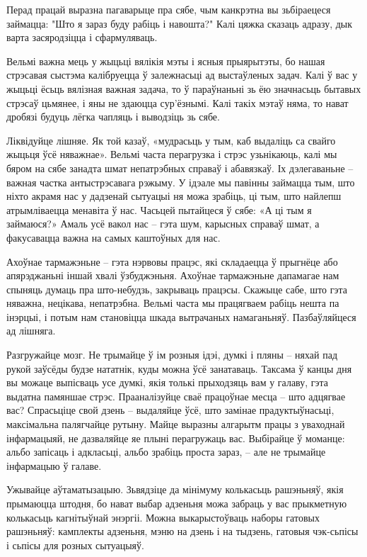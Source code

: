 Перад працай выразна пагаварыце пра сябе, чым канкрэтна вы зьбіраецеся займацца: "Што я зараз буду рабіць і навошта?" Калі цяжка сказаць адразу, дык варта засяродзіцца і сфармуляваць.

Вельмі важна мець у жыцьці вялікія мэты і ясныя прыярытэты, бо нашая стрэсавая сыстэма калібруецца ў залежнасьці ад выстаўленых задач. Калі ў вас у жыцьці ёсьць вялізная важная задача, то ў параўнаньні зь ёю значнасьць бытавых стрэсаў цьмянее, і яны не здаюцца сур'ёзнымі. Калі такіх мэтаў няма, то нават дробязі будуць лёгка чапляць і выводзіць зь сябе.

Ліквідуйце лішняе. Як той казаў, «мудрасьць у тым, каб выдаліць са свайго жыцьця ўсё няважнае». Вельмі часта перагрузка і стрэс узьнікаюць, калі мы бяром на сябе занадта шмат непатрэбных справаў і абавязкаў. Іх дэлегаваньне – важная частка антыстрэсавага рэжыму. У ідэале мы павінны займацца тым, што ніхто акрамя нас у дадзенай сытуацыі ня можа зрабіць, ці тым, што найлепш атрымліваецца менавіта ў нас. Часьцей пытайцеся ў сябе: «А ці тым я займаюся?» Амаль усё вакол нас – гэта шум, карысных справаў шмат, а факусавацца важна на самых каштоўных для нас.

Ахоўнае тармажэньне – гэта нэрвовы працэс, які складаецца ў прыгнёце або апярэджаньні іншай хвалі ўзбуджэньня. Ахоўнае тармажэньне дапамагае нам спыняць думаць пра што-небудзь, закрываць працэсы. Скажыце сабе, што гэта няважна, нецікава, непатрэбна. Вельмі часта мы працягваем рабіць нешта па інэрцыі, і потым нам становіцца шкада вытрачаных намаганьняў. Пазбаўляйцеся ад лішняга.

Разгружайце мозг. Не трымайце ў ім розныя ідэі, думкі і пляны – няхай пад рукой заўсёды будзе нататнік, куды можна ўсё занатаваць. Таксама ў канцы дня вы можаце выпісваць усе думкі, якія толькі прыходзяць вам у галаву, гэта выдатна памяншае стрэс. Прааналізуйце сваё працоўнае месца – што адцягвае вас? Спрасьціце свой дзень – выдаляйце ўсё, што замінае прадуктыўнасьці, максімальна палягчайце рутыну. Майце выразны алгарытм працы з уваходнай інфармацыяй, не дазваляйце яе плыні перагружаць вас. Выбірайце ў моманце: альбо запісаць і адкласьці, альбо зрабіць проста зараз, – але не трымайце інфармацыю ў галаве.

Ужывайце аўтаматызацыю. Зьвядзіце да мінімуму колькасьць рашэньняў, якія прымаюцца штодня, бо нават выбар адзеньня можа забраць у вас прыкметную колькасьць кагнітыўнай энэргіі. Можна выкарыстоўваць наборы гатовых рашэньняў: камплекты адзеньня, мэню на дзень і на тыдзень, гатовыя чэк-сьпісы і сьпісы для розных сытуацыяў.

